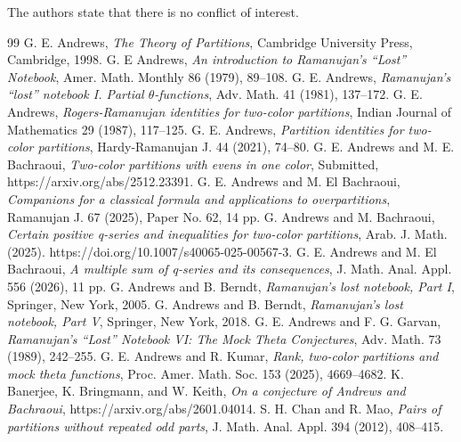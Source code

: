 \documentclass[reqno]{amsart}
\theoremstyle{definition}
\theoremstyle{plain}
\theoremstyle{remark}
\numberwithin{equation}{section}
\begin{document}
The authors state that there is no conflict of interest.
%
\begin{thebibliography}{99}
%
G. E. Andrews,
\emph{The Theory of Partitions},
Cambridge University Press, Cambridge, 1998.
%
G. E Andrews,
\emph{An introduction to Ramanujan’s ``Lost'' Notebook},
Amer. Math. Monthly 86 (1979), 89--108.
%
G. E. Andrews,
\emph{Ramanujan’s ``lost'' notebook I. Partial $\theta$-functions},
Adv. Math. 41 (1981), 137--172.
%
G. E. Andrews,
\emph{Rogers-Ramanujan identities for two-color partitions},
Indian Journal of Mathematics 29 (1987), 117--125.
%
%
G. E. Andrews,
\emph{Partition identities for two-color partitions},
Hardy-Ramanujan J. 44 (2021), 74--80.
%
G. E. Andrews and M. E. Bachraoui,
\emph{Two-color partitions with evens in one color},
Submitted,
https://arxiv.org/abs/2512.23391.
%
G. E. Andrews and M. El Bachraoui,
\emph{Companions for a classical formula and applications to overpartitions},
Ramanujan J. 67 (2025), Paper No. 62, 14 pp.
%
G. Andrews and M. Bachraoui,
\emph{Certain positive q-series and inequalities for two-color partitions},
Arab. J. Math. (2025). https://doi.org/10.1007/s40065-025-00567-3.
%
G. E. Andrews and M. El Bachraoui,
\emph{A multiple sum of q-series and its consequences},
J. Math. Anal. Appl. 556 (2026), 11 pp.
%
G. Andrews and B. Berndt,
\emph{Ramanujan’s lost notebook, Part I}, Springer, New York, 2005.
%
G. Andrews and B. Berndt,
\emph{Ramanujan’s lost notebook, Part V}, Springer, New York, 2018.
%
G. E. Andrews and F. G. Garvan,
\emph{Ramanujan’s “Lost” Notebook VI: The Mock Theta Conjectures},
Adv. Math. 73 (1989), 242--255.
%
G. E. Andrews and R. Kumar,
\emph{Rank, two-color partitions and mock theta functions},
Proc. Amer. Math. Soc. 153 (2025), 4669--4682.
%
K. Banerjee, K. Bringmann, and W. Keith,
\emph{On a conjecture of Andrews and Bachraoui},
https://arxiv.org/abs/2601.04014.
%
S. H. Chan and R. Mao,
\emph{Pairs of partitions without repeated odd parts},
J. Math. Anal. Appl. 394 (2012), 408--415.
%

\end{thebibliography}
\end{document}

